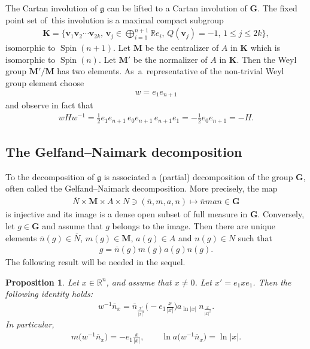 \documentclass[10pt,a4paper]{amsart}
\DeclareMathOperator{\Spin}{Spin}
\numberwithin{equation}{section}
\newtheorem{prop}[theor]{Proposition}
\begin{document}
The Cartan involution of $\mathfrak g$ can be lifted to a Cartan involution of $\mathbf G$. The fixed point set of~this involution is a maximal compact subgroup
\begin{gather*}
\mathbf K= \bigg\{\mathbf v_1\mathbf v_2\cdots \mathbf v_{2k},\, \mathbf v_j \in \bigoplus_{i=1}^{n+1} \mathbb R e_i,\, Q(\mathbf v_j) = -1, \, 1\leq j \leq 2k\bigg\},
\end{gather*}
isomorphic to $\Spin(n+1)$.
Let $\mathbf M$ be the centralizer of $A$ in $\mathbf K$ which is isomorphic to $\Spin(n)$.
Let $\mathbf M'$ be the normalizer of $A$ in $\mathbf K$. Then the Weyl group $\mathbf M'/\mathbf M$ has two elements. As~a~rep\-resentative of the non-trivial Weyl group element choose
\begin{gather*}
w= e_1e_{n+1}
\end{gather*}
and observe in fact that
\begin{gather*}
wHw^{-1} = \frac{1}{2}e_1e_{n+1}\,e_0 e_{n+1}\, e_{n+1}e_1 = -\frac{1}{2}e_0e_{n+1}= -H.
\end{gather*}

\subsection{The Gelfand--Naimark decomposition}
To the decomposition of $\mathfrak g$ is associated a (partial) decomposition of the group $\mathbf G$, often called the Gelfand--Naimark decomposition.
More precisely, the map
\begin{gather*}
\overline N\times \mathbf M\times A\times N \ni (\overline n, m, a, n) \mapsto \overline n man\in \mathbf G
\end{gather*}
is injective and its image is a dense open subset of full measure in $\mathbf G$. Conversely, let $g\in \mathbf G$ and assume that $g$ belongs to the image. Then there are unique elements $\overline n(g)\in \overline N$, $m(g)\in \mathbf M$, $a(g)\in A$ and $n(g)\in N$ such that
\begin{gather*}
g=\overline n(g) m(g) a(g) n(g) .
\end{gather*}
The following result will be needed in the sequel.

\begin{prop} \label{Gelfanddec}
 Let $x\in \mathbb R^n$, and assume that $x\neq 0$. Let $x' = e_1xe_1$. Then the following iden\-tity holds:
\begin{gather}\label{GN-decomp}
w^{-1} \overline n_x
=\overline n_{\frac{x'}{\vert x\vert^2}} \bigg({-}e_1\frac{x}{\vert x\vert}\bigg) a_{\ln \vert x\vert}\
n_{\frac{x}{\vert x\vert^2}} .
\end{gather}
In particular,
\begin{gather*}
m\big(w^{-1} \overline n_x\big) = -e_1\frac{x}{\vert x\vert},\qquad
\ln a\big(w^{-1}\overline n_x\big)=\ln \vert x\vert .
\end{gather*}
\end{prop}
\end{document}
